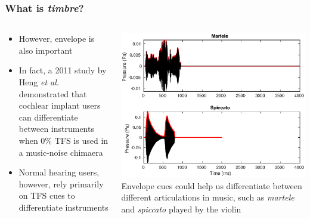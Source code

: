 \documentclass[aspectratio=1610]{beamer}
\begin{document}
\begin{frame}
\frametitle{What is \textit{timbre}?}

\begin{columns}
\begin{column}{0.4\textwidth}
\begin{itemize}[label = $\blacktriangleright$]
\item However, envelope is also important\vspace{.5em}
\item In fact, a 2011 study by Heng \textit{et al.} demonstrated that cochlear implant users can differentiate between instruments when 0\% TFS is used in a music-noise chimaera\vspace{.5em}
\item Normal hearing users, however, rely primarily on TFS cues to differentiate instruments
\end{itemize}
\end{column}
\begin{column}{0.6\textwidth}
\includegraphics[width = 1.0\textwidth]{martele_spiccato_compare}
\centering
Envelope cues could help us differentiate between different articulations in music, such as \textit{martele} and \textit{spiccato} played by the violin
\end{column}
\end{columns}

\end{frame}
\end{document}
